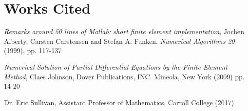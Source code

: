 \documentclass[a4paper]{article}
\theoremstyle{remark}
\theoremstyle{remark}
\begin{document}
\section{Works Cited}
\begin{thebibliography}{3}
\textit{Remarks around 50 lines of Matlab: short finite element implementation}, Jochen Alberty, Carsten Carstensen and Stefan A. Funken, \textit{Numerical Algorithms 20} (1999), pp. 117-137

\textit{Numerical Solution of Partial Differential Equations by the Finite Element Method}, Claes Johnson, Dover Publications, INC. Mineola, New York (2009) pp. 14-20



Dr. Eric Sullivan, Assistant Professor of Mathematics, Carroll College (2017)

\end{thebibliography}
\end{document}
